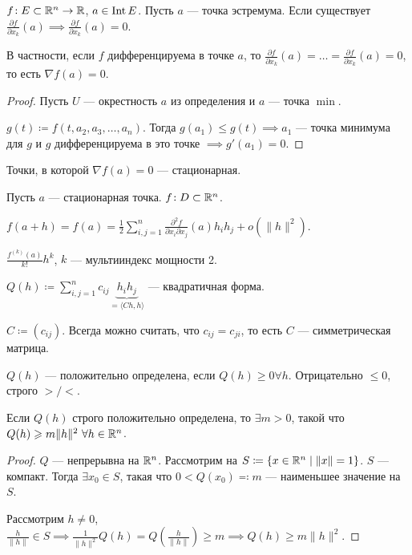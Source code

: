 \begin{theorem}
    $f\!: E \subset \mathbb{R}^n \to \mathbb{R}$,  $a \in \operatorname{Int} E$. Пусть  $a$ --- точка эстремума. Если существует  $\frac{\partial f}{\partial x_k}(a) \implies \frac{\partial f}{\partial x_k}(a) = 0$.

    В частности, если $f$ дифференцируема в точке  $a$, то  $\frac{\partial f}{\partial x_k}(a) = \ldots = \frac{\partial f}{\partial x_k}(a) = 0$, то есть $\nabla f(a) = 0$.
\end{theorem}
\begin{proof}
    Пусть $U$ --- окрестность  $a$ из определения и  $a$ --- точка  $\min$.

     $g(t) \coloneqq f(t, a_2, a_3, \ldots, a_n)$. Тогда $g(a_1) \le g(t) \implies a_1$ --- точка минимума для $g$ и  $g$ дифференцируема в это точке  $\implies g'(a_1) = 0$.
\end{proof}
\begin{definition}
    Точки, в которой $\nabla f(a) = 0$ --- стационарная.
\end{definition}
\begin{remark}
    Пусть $a$ --- стационарная точка.  $f\!: D \subset \mathbb{R}^n$.

    $f(a+h) = f(a) = \frac{1}{2} \sum\limits_{i, j = 1}^n \frac{\partial^2 f}{\partial x_i \partial x_j}(a) h_i h_j + o(\|h\|^2)$.

    $\frac{f^{(k)}(a)}{k!}h^k$, $k$ --- мультииндекс мощности 2.
\end{remark}
\begin{definition}
    $Q(h) \coloneqq \sum\limits_{i, j = 1}^n c_{ij} \underbrace{h_ih_j}_{=\langle Ch, h\rangle}$ --- квадратичная форма.

    $C \coloneqq (c_{ij})$. Всегда можно считать, что $c_{ij} = c_{ji}$, то есть  $C$ --- симметрическая матрица.
\end{definition}
\begin{definition}
    $Q(h)$ --- положительно определена, если  $Q(h) \ge 0 \forall h$.
    Отрицательно $\le 0$, строго $>/<$.
\end{definition}
\begin{theorem}
    Если $Q(h)$ строго положительно определена, то  $\exists m > 0$, такой что  $Q(h) \geqslant m \|h\|^2\ \forall h \in \mathbb{R}^n$.
\end{theorem}
\begin{proof}
    $Q$ --- непрерывна на $\mathbb{R}^n$. Рассмотрим на   $S\coloneqq \{x \in \mathbb{R}^n \mid \|x\|=1\}$.  $S$ --- компакт. Тогда  $\exists x_0 \in S$, такая что $0 < Q(x_0) \eqqcolon m$ --- наименьшее значение на  $S$.

    Рассмотрим  $h \neq 0$, $\frac{h}{\|h\|} \in S \implies \frac{1}{\|h\|^2}Q(h) =  Q(\frac{h}{\|h\|}) \ge m \implies Q(h) \ge m\|h\|^2$.
\end{proof}
